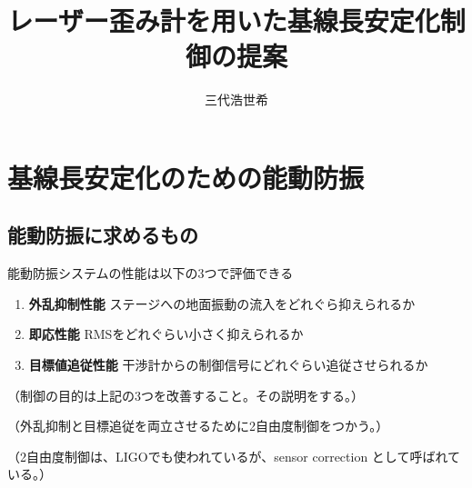 \documentclass[a4paper,12pt]{jsarticle}
\title{レーザー歪み計を用いた基線長安定化制御の提案}
\author{三代浩世希}
\begin{document}
\setcounter{tocdepth}{3}
\maketitle
\abstract{}
\tableofcontents

\section{基線長安定化のための能動防振}
\subsection{能動防振に求めるもの}
能動防振システムの性能は以下の3つで評価できる
\begin{enumerate}
\item \textbf{外乱抑制性能} ステージへの地面振動の流入をどれぐら抑えられるか 
\item \textbf{即応性能} RMSをどれぐらい小さく抑えられるか
\item \textbf{目標値追従性能} 干渉計からの制御信号にどれぐらい追従させられるか
\end{enumerate}

（制御の目的は上記の3つを改善すること。その説明をする。）

（外乱抑制と目標追従を両立させるために2自由度制御をつかう。）

（2自由度制御は、LIGOでも使われているが、sensor correction として呼ばれている。）



\end{document}
